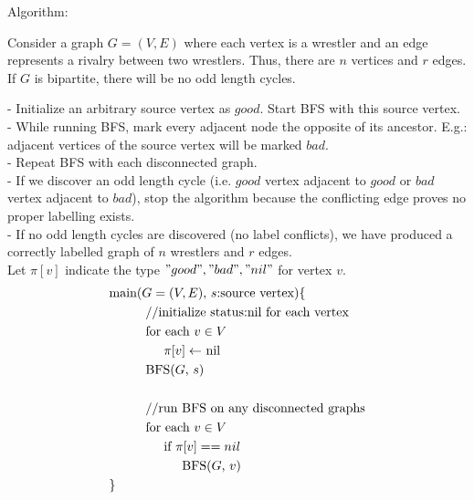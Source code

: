 \documentclass[a4paper]{report}
\begin{document}
\begin{enumerate}
      Algorithm:

      Consider a graph $G=(V,E)$ where each vertex is a wrestler and an edge represents a rivalry between two wrestlers.
      Thus, there are $n$ vertices and $r$ edges. If $G$ is bipartite, there will be no odd length cycles. 

      - Initialize an arbitrary source vertex as $good$. Start BFS with this source vertex. \\
      - While running BFS, mark every adjacent node the opposite of its ancestor. E.g.: adjacent vertices of the source vertex 
      will be marked $bad$. \\
      - Repeat BFS with each disconnected graph. \\
      - If we discover an odd length cycle (i.e. $good$ vertex adjacent to $good$ or $bad$ vertex adjacent to $bad$), stop 
      the algorithm because the conflicting edge proves no proper labelling exists. \\
      - If no odd length cycles are discovered (no label conflicts), we have produced a correctly labelled graph of $n$ wrestlers and $r$ edges. \\

      Let $\pi[v]$ indicate the type $"good", "bad", "nil"$ for vertex $v$.
      \begin{align*}
        &\text{main($G=(V,E)$, $s$:source vertex)\{} \\
        & \hspace{1cm} \text{//initialize status:nil for each vertex}\\
        & \hspace{1cm} \text{for each $v \in V$} \\
        & \hspace{1.5cm} \text{$\pi[v] \leftarrow$ nil} \\
        & \hspace{1cm} \text{BFS($G$, $s$)} \\\\
        & \hspace{1cm} \text{//run BFS on any disconnected graphs}\\
        & \hspace{1cm} \text{for each $v \in V$} \\
        & \hspace{1.5cm} \text{if $\pi[v] == nil$}  \\
        & \hspace{2cm} \text{BFS($G$, $v$)}   \\
        &\text{\}} 
      \end{align*}


\end{enumerate}
\end{document}
